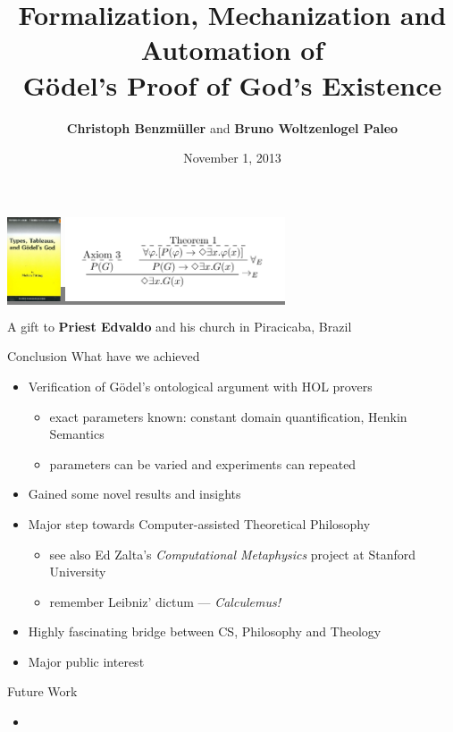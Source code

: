 \documentclass[9pt,mathserif]{beamer}
\title[On G\"{o}del's Proof of God's
Existence]{Formalization, Mechanization and Automation of \\ G\"{o}del's
  Proof of God's Existence}
\author{\textbf{Christoph Benzm\"{u}ller} and \textbf{Bruno Woltzenlogel Paleo}}
\date[1.11.2013]{November 1, 2013}
\begin{document}
\begin{frame}
  \titlepage
\colorbox{gray}{\includegraphics[height=2.5cm]{buch7.jpg} }
\hfill
\colorbox{gray}{\includegraphics[height=2.5cm]{nd.png}}

\hfill \begin{footnotesize}A gift to \textbf{Priest Edvaldo} and his church in Piracicaba, Brazil\end{footnotesize}
\end{frame}













\begin{frame}{Conclusion} \large
What have we achieved \\[.5em]
\begin{itemize}
\item Verification of G\"odel's ontological argument with HOL provers
  \begin{itemize}
  \item exact parameters known: constant domain quantification, Henkin Semantics
  \item parameters can be varied and experiments can repeated
  \end{itemize}
\item Gained some novel results and insights
\item Major  step towards \alert{Computer-assisted Theoretical Philosophy}
 \begin{itemize}
  \item see also Ed Zalta's \emph{Computational Metaphysics} project at Stanford University
  \item remember Leibniz' dictum --- \emph{Calculemus!}
  \end{itemize}
\item Highly fascinating bridge between CS, Philosophy and Theology
\item Major public interest 
\end{itemize}
\vfill
Future Work
\begin{itemize}
\item 
\end{itemize}
\end{frame}
\end{document}
